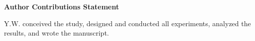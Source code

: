\documentclass[12pt]{article}
\begin{document}
\noindent\textbf{Author Contributions Statement}

\vspace{1em}

\noindent Y.W. conceived the study, designed and conducted all experiments, analyzed the results, and wrote the manuscript.
\end{document}
